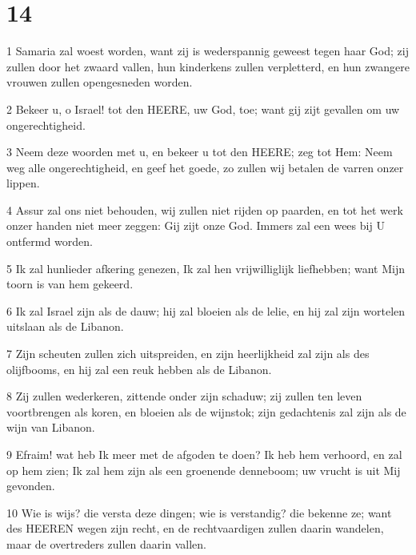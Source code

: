 \chapter{14}

\par 1 Samaria zal woest worden, want zij is wederspannig geweest tegen haar God; zij zullen door het zwaard vallen, hun kinderkens zullen verpletterd, en hun zwangere vrouwen zullen opengesneden worden.
\par 2 Bekeer u, o Israel! tot den HEERE, uw God, toe; want gij zijt gevallen om uw ongerechtigheid.
\par 3 Neem deze woorden met u, en bekeer u tot den HEERE; zeg tot Hem: Neem weg alle ongerechtigheid, en geef het goede, zo zullen wij betalen de varren onzer lippen.
\par 4 Assur zal ons niet behouden, wij zullen niet rijden op paarden, en tot het werk onzer handen niet meer zeggen: Gij zijt onze God. Immers zal een wees bij U ontfermd worden.
\par 5 Ik zal hunlieder afkering genezen, Ik zal hen vrijwilliglijk liefhebben; want Mijn toorn is van hem gekeerd.
\par 6 Ik zal Israel zijn als de dauw; hij zal bloeien als de lelie, en hij zal zijn wortelen uitslaan als de Libanon.
\par 7 Zijn scheuten zullen zich uitspreiden, en zijn heerlijkheid zal zijn als des olijfbooms, en hij zal een reuk hebben als de Libanon.
\par 8 Zij zullen wederkeren, zittende onder zijn schaduw; zij zullen ten leven voortbrengen als koren, en bloeien als de wijnstok; zijn gedachtenis zal zijn als de wijn van Libanon.
\par 9 Efraim! wat heb Ik meer met de afgoden te doen? Ik heb hem verhoord, en zal op hem zien; Ik zal hem zijn als een groenende denneboom; uw vrucht is uit Mij gevonden.
\par 10 Wie is wijs? die versta deze dingen; wie is verstandig? die bekenne ze; want des HEEREN wegen zijn recht, en de rechtvaardigen zullen daarin wandelen, maar de overtreders zullen daarin vallen.




